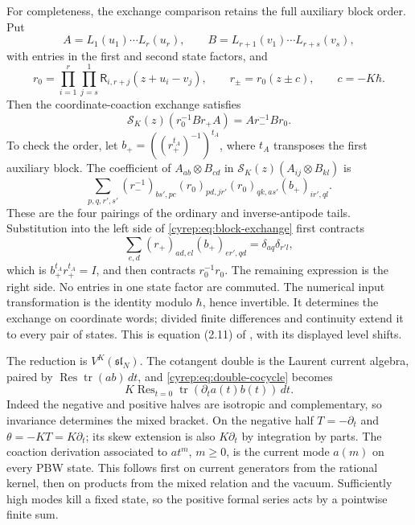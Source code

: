 For completeness, the exchange comparison retains the full
auxiliary block order. Put
\[
 A=L_1(u_1)\cdots L_r(u_r),\qquad
 B=L_{r+1}(v_1)\cdots L_{r+s}(v_s),
\]
with entries in the first and second state factors, and
\[
 r_0=\prod_{i=1}^{r}\prod_{j=s}^{1}
             \mathsf R_{i,r+j}(z+u_i-v_j),\qquad
 r_\pm=r_0(z\pm c),\qquad c=-K\hbar.
\]
Then the coordinate-coaction exchange satisfies
\begin{equation}\label{cyrep:eq:block-exchange}
 \mathcal S_K(z)(r_0^{-1}B r_+ A)=A r_-^{-1}B r_0.
\end{equation}
To check the order, let
\(b_+=((r_+^{t_A})^{-1})^{t_A}\), where \(t_A\)
transposes the first auxiliary block.
The coefficient of \(A_{ab}\otimes B_{cd}\) in
\(\mathcal S_K(z)(A_{ij}\otimes B_{kl})\) is
\[
 \sum_{p,q,r',s'}
 (r_-^{-1})_{bs',pc}(r_0)_{pd,jr'}
                  (r_0)_{qk,as'}(b_+)_{ir',ql}.
\]
These are the four pairings of the ordinary and inverse-antipode
tails. Substitution into the left side of
\eqref{cyrep:eq:block-exchange} first contracts
\[
 \sum_{e,d}(r_+)_{ad,el}(b_+)_{er',qd}
                         =\delta_{aq}\delta_{r'l},
\]
which is \(b_+^{t_A}r_+^{t_A}=I\), and then contracts
\(r_0^{-1}r_0\). The remaining expression is the right side.
No entries in one state factor are commuted.
The numerical input transformation is the identity modulo
\(\hbar\), hence invertible.
It determines the exchange on coordinate words; divided finite
differences and continuity extend it to every pair of states.
This is equation (2.11) of \cite{EtingofKazhdanV}, with its
displayed level shifts.

The reduction is \(V^K(\mathfrak{sl}_N)\).
The cotangent double is the Laurent current algebra, paired by
\(\operatorname{Res}\operatorname{tr}(ab)\,dt\), and
\eqref{cyrep:eq:double-cocycle} becomes
\[
 K\operatorname{Res}_{t=0}
                 \operatorname{tr}(\partial_ta(t)b(t))\,dt.
\]
Indeed the negative and positive halves are isotropic and
complementary, so invariance determines the mixed bracket.
On the negative half \(T=-\partial_t\) and
\(\theta=-KT=K\partial_t\); its skew extension is also
\(K\partial_t\) by integration by parts.
The coaction derivation associated to \(at^m\), \(m\geq0\),
is the current mode \(a(m)\) on every PBW state.
This follows first on current generators from the rational kernel,
then on products from the mixed relation and the vacuum.
Sufficiently high modes kill a fixed state, so the positive formal
series acts by a pointwise finite sum.

